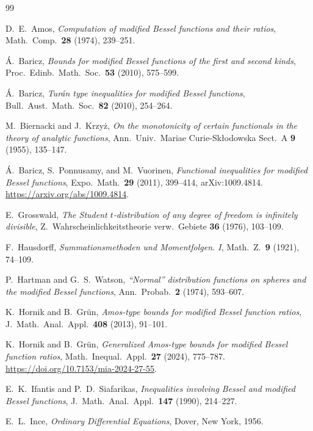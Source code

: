 \documentclass[preprint,12pt]{elsarticle}
\theoremstyle{plain}
\theoremstyle{definition}
\theoremstyle{remark}
\begin{document}
\begin{thebibliography}{99}

D.~E.~Amos,
\emph{Computation of modified Bessel functions and their ratios},
Math.\ Comp.\ \textbf{28} (1974), 239--251.

\'A.~Baricz,
\emph{Bounds for modified Bessel functions of the first and second kinds},
Proc.\ Edinb.\ Math.\ Soc.\ \textbf{53} (2010), 575--599.

\'A.~Baricz,
\emph{Tur\'an type inequalities for modified Bessel functions},
Bull.\ Aust.\ Math.\ Soc.\ \textbf{82} (2010), 254--264.

M.~Biernacki and J.~Krzy\.z,
\emph{On the monotonicity of certain functionals in the theory of analytic
functions},
Ann.\ Univ.\ Mariae Curie-Sk\l odowska Sect.\ A \textbf{9} (1955), 135--147.

\'A.~Baricz, S.~Ponnusamy, and M.~Vuorinen,
\emph{Functional inequalities for modified Bessel functions},
Expo.\ Math.\ \textbf{29} (2011), 399--414, arXiv:1009.4814.
\url{https://arxiv.org/abs/1009.4814}.

E.~Grosswald,
\emph{The Student \(t\)-distribution of any degree of freedom is infinitely
divisible},
Z.\ Wahrscheinlichkeitstheorie verw.\ Gebiete \textbf{36} (1976), 103--109.

F.~Hausdorff,
\emph{Summationsmethoden und Momentfolgen. I},
Math.\ Z.\ \textbf{9} (1921), 74--109.

P.~Hartman and G.~S.~Watson,
\emph{``Normal'' distribution functions on spheres and the modified Bessel
functions},
Ann.\ Probab.\ \textbf{2} (1974), 593--607.

K.~Hornik and B.~Gr\"un,
\emph{Amos-type bounds for modified Bessel function ratios},
J.\ Math.\ Anal.\ Appl.\ \textbf{408} (2013), 91--101.

K.~Hornik and B.~Gr\"un,
\emph{Generalized Amos-type bounds for modified Bessel function ratios},
Math.\ Inequal.\ Appl.\ \textbf{27} (2024), 775--787.
\url{https://doi.org/10.7153/mia-2024-27-55}.

E.~K.~Ifantis and P.~D.~Siafarikas,
\emph{Inequalities involving Bessel and modified Bessel functions},
J.\ Math.\ Anal.\ Appl.\ \textbf{147} (1990), 214--227.

E.~L.~Ince,
\emph{Ordinary Differential Equations},
Dover, New York, 1956.


\end{thebibliography}
\end{document}
